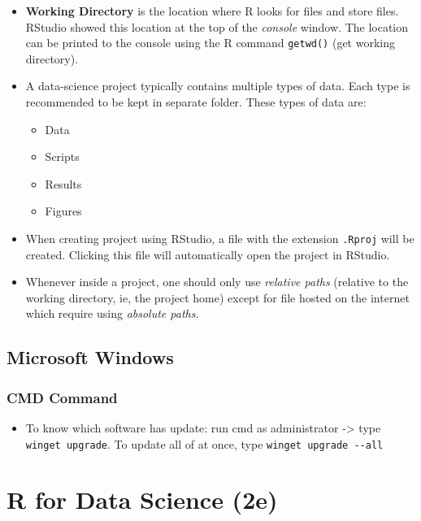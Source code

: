 \documentclass[
  letterpaper,
  DIV=11,
  numbers=noendperiod]{scrreprt}
\providecommand{\tightlist}{%
  \setlength{\itemsep}{0pt}\setlength{\parskip}{0pt}}\usepackage{longtable,booktabs,array}
\begin{document}
\begin{itemize}
\tightlist
\item
  \textbf{Working Directory} is the location where R looks for files and
  store files. RStudio showed this location at the top of the
  \emph{console} window. The location can be printed to the console
  using the R command \texttt{getwd()} (get working directory).
\item
  A data-science project typically contains multiple types of data. Each
  type is recommended to be kept in separate folder. These types of data
  are:

  \begin{itemize}
  \tightlist
  \item
    Data
  \item
    Scripts
  \item
    Results
  \item
    Figures
  \end{itemize}
\item
  When creating project using RStudio, a file with the extension
  \texttt{.Rproj} will be created. Clicking this file will automatically
  open the project in RStudio.
\item
  Whenever inside a project, one should only use \emph{relative paths}
  (relative to the working directory, ie, the project home) except for
  file hosted on the internet which require using \emph{absolute paths}.
\end{itemize}

\chapter{Microsoft Windows}\label{microsoft-windows}

\section{CMD Command}\label{cmd-command}

\begin{itemize}
\tightlist
\item
  To know which software has update: run cmd as administrator
  -\textgreater{} type \texttt{winget\ upgrade}. To update all of at
  once, type \texttt{winget\ upgrade\ -\/-all}
\end{itemize}

\part{R for Data Science (2e)}
\end{document}
